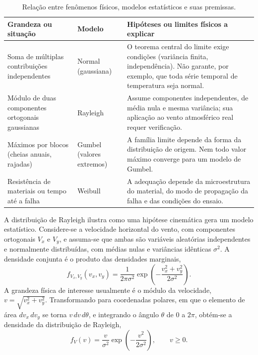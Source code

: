 \begin{table}[htbp]
\centering
\caption{Relação entre fenômenos físicos, modelos estatísticos e suas premissas.}
\label{tab:modelos_fisicos}
\small
\begin{tabular}{p{3.8cm} p{2.4cm} p{7.8cm}}
\toprule
\textbf{Grandeza ou situação} & \textbf{Modelo} & \textbf{Hipóteses ou limites físicos a explicar} \\
\midrule
Soma de múltiplas contribuições independentes & Normal (gaussiana) & O teorema central do limite exige condições (variância finita, independência). Não garante, por exemplo, que toda série temporal de temperatura seja normal. \\
Módulo de duas componentes ortogonais gaussianas & Rayleigh & Assume componentes independentes, de média nula e mesma variância; sua aplicação ao vento atmosférico real requer verificação. \\
Máximos por blocos (cheias anuais, rajadas) & Gumbel (valores extremos) & A família limite depende da forma da distribuição de origem. Nem todo valor máximo converge para um modelo de Gumbel. \\
Resistência de materiais ou tempo até a falha & Weibull & A adequação depende da microestrutura do material, do modo de propagação da falha e das condições do ensaio. \\
\bottomrule
\end{tabular}
\end{table}

A distribuição de Rayleigh ilustra como uma hipótese cinemática gera um modelo estatístico. Considere-se a velocidade horizontal do vento, com componentes ortogonais $V_x$ e $V_y$, e assuma-se que ambas são variáveis aleatórias independentes e normalmente distribuídas, com médias nulas e variâncias idênticas $\sigma^2$. A densidade conjunta é o produto das densidades marginais,
\begin{equation}
    f_{V_x,V_y}(v_x, v_y) = \frac{1}{2\pi\sigma^2} \exp\left( -\frac{v_x^2 + v_y^2}{2\sigma^2} \right).
\end{equation}
A grandeza física de interesse usualmente é o módulo da velocidade, $v = \sqrt{v_x^2 + v_y^2}$. Transformando para coordenadas polares, em que o elemento de área $dv_x\,dv_y$ se torna $v\,dv\,d\theta$, e integrando o ângulo $\theta$ de $0$ a $2\pi$, obtém-se a densidade da distribuição de Rayleigh,
\begin{equation}
    f_V(v) = \frac{v}{\sigma^2} \exp\left( -\frac{v^2}{2\sigma^2} \right), \qquad v \geq 0.
    \label{eq:rayleigh}
\end{equation}

